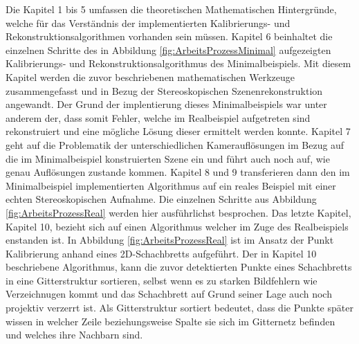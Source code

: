 Die Kapitel 1 bis 5 umfassen die theoretischen Mathematischen Hintergründe, welche für das Verständnis der implementierten Kalibrierungs- und Rekonstruktionsalgorithmen vorhanden sein müssen. Kapitel 6 beinhaltet die einzelnen Schritte des in Abbildung \ref{fig:ArbeitsProzessMinimal} aufgezeigten Kalibrierungs- und Rekonstruktionsalgorithmus des Minimalbeispiels. Mit diesem Kapitel werden die zuvor beschriebenen mathematischen Werkzeuge zusammengefasst und in Bezug der Stereoskopischen Szenenrekonstruktion angewandt. Der Grund der implentierung dieses Minimalbeispiels war unter anderem der, dass somit Fehler, welche im Realbeispiel aufgetreten sind rekonstruiert und eine mögliche Lösung dieser ermittelt werden konnte. Kapitel 7 geht auf die Problematik der unterschiedlichen Kamerauflösungen im Bezug auf die im Minimalbeispiel konstruierten Szene ein und führt auch noch auf, wie genau Auflösungen zustande kommen. Kapitel 8 und 9 transferieren dann den im Minimalbeispiel implementierten Algorithmus auf ein reales Beispiel mit einer echten Stereoskopischen Aufnahme. Die einzelnen Schritte aus Abbildung \ref{fig:ArbeitsProzessReal} werden hier ausführlichst besprochen. Das letzte Kapitel, Kapitel 10, bezieht sich auf einen Algorithmus welcher im Zuge des Realbeispiels enstanden ist. In Abbildung \ref{fig:ArbeitsProzessReal} ist im Ansatz der Punkt Kalibrierung anhand eines 2D-Schachbretts aufgeführt. Der in Kapitel 10 beschriebene Algorithmus, kann die zuvor detektierten Punkte eines Schachbretts in eine Gitterstruktur sortieren, selbst wenn es zu starken Bildfehlern wie Verzeichnugen kommt und das Schachbrett auf Grund seiner Lage auch noch projektiv verzerrt ist. Als Gitterstruktur sortiert bedeutet, dass die Punkte später wissen in welcher Zeile beziehungsweise Spalte sie sich im Gitternetz befinden und welches ihre Nachbarn sind. 

